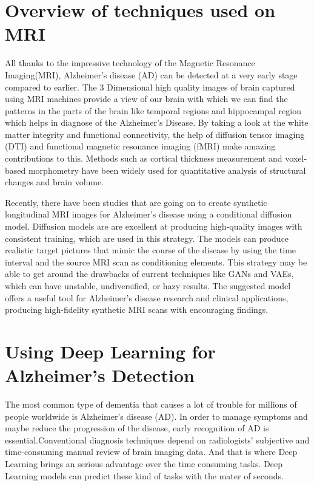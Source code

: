 \documentclass[12pt,onecolumn]{report}
\begin{document}
\section{Overview of techniques used on MRI}
All thanks to the impressive technology of the Magnetic Resonance Imaging(MRI), Alzheimer's disease (AD) can be detected at a very early stage compared to earlier. The 3 Dimensional high quality images of brain captured using MRI machines provide a view of our brain with which we can find the patterns in the parts of the brain like temporal regions and hippocampal region which helps in diagnose of the Alzheimer’s Disease. By taking a look at the white matter integrity and functional connectivity, the help of diffusion tensor imaging (DTI) and functional magnetic resonance imaging (fMRI) make amazing contributions to this. Methods such as cortical thickness measurement and voxel-based morphometry have been widely used for quantitative analysis of structural changes and brain volume\cite{zou2023}.

Recently, there have been studies that are going on to create synthetic longitudinal MRI images for Alzheimer's disease using a conditional diffusion model. Diffusion models are are excellent at producing high-quality images with consistent training, which are used in this strategy. The models can produce realistic target pictures that mimic the course of the disease by using the time interval and the source MRI scan as conditioning elements. This strategy may be able to get around the drawbacks of current techniques like GANs and VAEs, which can have unstable, undiversified, or hazy results. The suggested model offers a useful tool for Alzheimer's disease research and clinical applications, producing high-fidelity synthetic MRI scans with encouraging findings\cite{Duy2024}.


\section{Using Deep Learning for Alzheimer’s Detection}
The most common type of dementia that causes a lot of trouble for  millions of people worldwide is Alzheimer's disease (AD). In order to manage symptoms and maybe reduce the progression of the disease, early recognition of AD is essential\cite{2023ShenLiu}.Conventional diagnosis techniques depend on radiologists' subjective and time-consuming manual review of brain imaging data. And that is where Deep Learning brings an serious advantage over the time consuming tasks. Deep Learning models can predict these kind of tasks with the mater of seconds.
\end{document}
